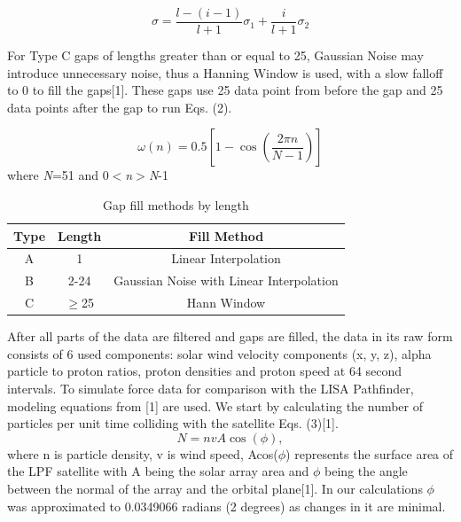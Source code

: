 \documentclass[%
 reprint,
 amsmath,amssymb,
 aps,
]{revtex4-2}
\begin{document}
\begin{equation}\label{eq:Gaussian Window Equations}
\sigma=\frac{l-(i-1)}{l+1}\sigma_{1}+\frac{i}{l+1}\sigma_{2}
\end{equation}

For Type C gaps of lengths greater than or equal to 25, Gaussian Noise may introduce unnecessary noise, thus a Hanning Window is used, with a slow falloff to 0 to fill the gaps[1]. These gaps use 25 data point from before the gap and 25 data points after the gap to run Eqs. (2).

\begin{equation}\label{eq:Hanning Window}
\omega(n)=0.5[1-\cos{(\frac{2\pi n}{N-1})}]
\end{equation}
where \textit{N}=51 and 0$<$\textit{n}$>$\textit{N}-1

\begin{table}[htbp]
\caption{Gap fill methods by length}
\begin{center}
\renewcommand{\arraystretch}{1.5}
\begin{tabular}{|c|c|c|}
\hline
Type & Length & Fill Method\\
\hline
A & 1 & Linear Interpolation\\
\hline
B & 2-24 & Gaussian Noise with Linear Interpolation\\
\hline
C & $\geq$25 & Hann Window\\
\hline

\end{tabular}
\label{tab1}
\end{center}
\end{table}



After all parts of the data are filtered and gaps are filled, the data in its raw form consists of 6 used components: solar wind velocity components (x, y, z), alpha particle to proton ratios, proton densities and proton speed at 64 second intervals. To simulate force data for comparison with the LISA Pathfinder, modeling equations from [1] are used. We start by calculating the number of particles per unit time colliding with the satellite Eqs. (3)[1].
\begin{equation}\label{eq:Hanning Window}
N=n v A\cos(\phi),
\end{equation}
where n is particle density, v is wind speed, Acos(\(\phi\)) represents the surface area of the LPF satellite with A being the solar array area and \(\phi\) being the angle between the normal of the array and the orbital plane[1]. In our calculations \(\phi\) was approximated to 0.0349066 radians (2 degrees) as changes in it are minimal.
\end{document}
